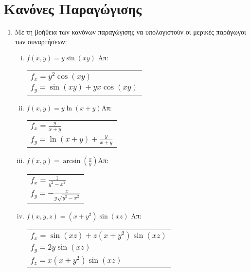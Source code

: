 



\pagestyle{askhseis}

\everymath{\displaystyle}






\begin{center}
\color{Col2}
\end{center} 

\section*{Κανόνες Παραγώγισης}

\begin{enumerate}
  \item Με τη βοήθεια των κανόνων παραγώγισης να υπολογιστούν οι μερικές 
    παράγωγοι των συναρτήσεων:

    \begin{enumerate}[i)]
      \item $f(x,y)=y\sin (xy)$ \hfill Απ: \begin{tabular}{l}
          $f_x=y^2\cos(xy)$ \\ 
          $f_y=\sin(xy)+yx\cos(xy)$
        \end{tabular}

      \item $f(x,y)=y\ln(x+y)$\hfill Απ: \begin{tabular}{l}
          $f_x=\frac{y}{x+y}$ \\ 
          $f_y=\ln(x+y)+\frac{y}{x+y}$
        \end{tabular}

      \item $f(x,y)=\arcsin(\frac{x}{y})$\hfill Απ: \begin{tabular}{l}
          $f_x=\frac{1}{y^2-x^2}$ \\ 
          $f_y=-\frac{x}{y\sqrt{y^2-x^2}}$
        \end{tabular}
      \item $ f(x,y,z) = (x+y^{2}) \sin{(xz)} $ \hfill Απ: \begin{tabular}{l}
          $ f_{x} = \sin{(xz)} + z(x+y^{2}) \sin{(xz)} $ \\
          $ f_{y} = 2y \sin{(xz)} $ \\
          $ f_{z} = x(x+y^{2}) \sin{(xz)} $
        \end{tabular} 
    \end{enumerate}


\end{enumerate}
